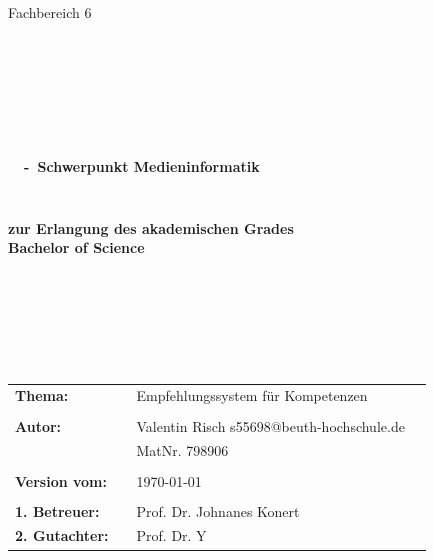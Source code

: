 \begin{center}
\Large{Fachbereich 6}
\end{center}
\begin{verbatim}




\end{verbatim}
\begin{center}
\doublespacing
\textbf{\LARGE{\titleDocument}}\\
\singlespacing
\begin{verbatim}

\end{verbatim}
\textbf{{~\subjectDocument~-~Schwerpunkt Medieninformatik}}
\end{center}
\begin{verbatim}

\end{verbatim}
\begin{center}

\end{center}
\begin{verbatim}

\end{verbatim}
\begin{center}
\textbf{zur Erlangung des akademischen Grades \\ Bachelor of Science}
\end{center}
\begin{verbatim}






\end{verbatim}
\begin{flushleft}
\begin{tabular}{llll}
\textbf{Thema:} & & Empfehlungssystem für Kompetenzen & \\
& & \\
\textbf{Autor:} & & Valentin Risch s55698@beuth-hochschule.de& \\
& & MatNr. 798906 & \\
& & \\
\textbf{Version vom:} & & \today &\\
& & \\
\textbf{1. Betreuer:} & & Prof. Dr. Johnanes Konert &\\
\textbf{2. Gutachter:} & & Prof. Dr. Y &\\
\end{tabular}
\end{flushleft}